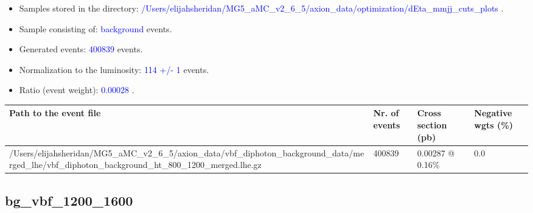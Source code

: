 \documentclass[a4paper, 10pt]{article}
\begin{document}
\begin{itemize}
  \item Samples stored in the directory: \textcolor{blue}{/\-Users/\-elijahsheridan/\-MG5\_aMC\_v2\_6\_5/\-axion\_data/\-optimization/\-dEta\_mmjj\_cuts\_plots} .
   \item Sample consisting of: \textcolor{blue}{background}  events.
   \item Generated events: \textcolor{blue}{400839 }  events.
   \item Normalization to the luminosity: \textcolor{blue}{114}\textcolor{blue}{ +/\-- }\textcolor{blue}{1 }  events.
   \item Ratio (event weight): \textcolor{blue}{0.00028 } .  
 
\end{itemize}
\begin{table}[H]
  \begin{center}
    \begin{tabular}{|m{55.0mm}|m{25.0mm}|m{30.0mm}|m{30.0mm}|}
      \hline
      {\cellcolor{yellow}         Path to the event file}& {\cellcolor{yellow}         Nr. of events}& {\cellcolor{yellow}         Cross section (pb)}& {\cellcolor{yellow}         Negative wgts (\%)}\\
      \hline
      {\cellcolor{white}          /\-Users/\-elijahsheridan/\-MG5\_aMC\_v2\_6\_5/\-axion\_data/\-vbf\_diphoton\_background\_data/\-merged\_lhe/\-vbf\_diphoton\_background\_ht\_800\_1200\_merged.lhe.gz}& {\cellcolor{white}          400839}& {\cellcolor{white}          0.00287 @ 0.16\%}& {\cellcolor{white}          0.0}\\
\hline
    \end{tabular}
  \end{center}
\end{table}

\subsection{ bg\_vbf\_1200\_1600}
\end{document}
